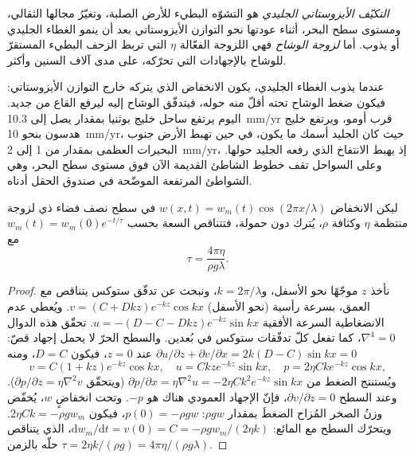 \begin{definition}\label{def:b3:mantle-convection:gia}
\emph{التكيّف الأيزوستاتي الجليدي} 
هو التشوّه البطيء للأرض الصلبة، وتغيّرُ مجالها الثقالي،
ومستوى سطح البحر، أثناء عودتها نحو التوازن الأيزوستاتي بعد أن ينمو الغطاء الجليدي أو يذوب.
أما \emph{لزوجة الوشاح} فهي
اللزوجة الفعّالة $\eta$ التي تربط الزحف البطيء المستقرّ للوشاح
بالإجهادات التي تحرّكه، على مدى آلاف السنين وأكثر.
\end{definition}

عندما يذوب الغطاء الجليدي، يكون الانخفاض الذي يتركه خارج التوازن الأيزوستاتي:
فيكون ضغط الوشاح تحته أقلّ منه حوله، فيتدفّق الوشاح إليه ليرفع القاع من جديد.
اليوم يرتفع ساحل خليج بوثنيا بمقدار يصل إلى \qty{10.3}{mm/yr} قرب أومو،
ويرتفع خليج هدسون بنحو \qty{10}{mm/yr}، حيث كان الجليد أسمك ما يكون،
في حين تهبط الأرض جنوب البحيرات العظمى بمقدار من 1 إلى \qty{2}{mm/yr}،
إذ يهبط الانتفاخ الذي رفعه الجليد حولها.
وعلى السواحل تقف خطوط الشاطئ القديمة الآن فوق مستوى سطح البحر،
وهي الشواطئ المرتفعة الموضّحة في صندوق الحقل أدناه.

\begin{theorem}\label{thm:b3:mantle-convection:relaxation}
ليكن الانخفاض $w(x, t) = w_m(t)\cos(2\pi x/\lambda)$ في سطح نصف فضاء
ذي لزوجة منتظمة $\eta$ وكثافة $\rho$، يُترك دون حمولة،
فتتناقص السعة بحسب $w_m(t) = w_m(0)e^{-t/\tau}$ مع
\[
  \tau = \frac{4\pi\eta}{\rho g\lambda} .
\]
\end{theorem}

\begin{proof}
نأخذ $z$ موجّهًا نحو الأسفل، و$k = 2\pi/\lambda$، ونبحث عن تدفّق ستوكس يتناقص
مع العمق، بسرعة رأسية (نحو الأسفل) $v = (C + Dkz)e^{-kz}\cos kx$.
ويُعطي عدم الانضغاطية السرعة الأفقية $u = -(D - C - Dkz)e^{-kz}\sin
kx$. تحقّق هذه الدوال $\nabla^4 = 0$، كما تفعل كلّ تدفّقات ستوكس في
بُعدين. والسطح الحرّ لا يحمل إجهاد قصّ: $\partial u/\partial
z + \partial v/\partial x = 2k(D - C)\sin kx = 0$ عند $z = 0$، فيكون $D = C$، ومنه
\[
  v = C(1 + kz)e^{-kz}\cos kx,\quad u = Ckze^{-kz}\sin kx,\quad
  p = 2\eta Cke^{-kz}\cos kx,
\]
ويُستنتج الضغط من $\partial p/\partial x = \eta\nabla^2u = -2\eta
Ck^2e^{-kz}\sin kx$ (ويتحقّق $\partial p/\partial z = \eta\nabla^2v$). وعند
السطح $\partial v/\partial z = 0$، فإنّ الإجهاد العمودي هناك هو $-p$. وتحت
انخفاضٍ $w$، يُخفّض وزنُ الصخر المُزاح الضغطَ بمقدار $\rho
gw$: $p(0) = -\rho gw$، فيكون $2\eta Ck = -\rho gw_m$. ويتحرّك السطح مع
المائع: $\mathrm dw_m/\mathrm dt = v(0) = C = -\rho gw_m/(2\eta k)$، الذي
يتناقص حلّه بالزمن $\tau = 2\eta k/(\rho g) = 4\pi\eta/(\rho g\lambda)$.
\end{proof}


